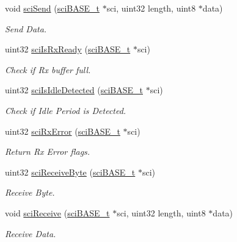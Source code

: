 \begin{DoxyCompactItemize}
void \mbox{\hyperlink{group__SCI_ga0a24e75961adf4102892d78e9620c042}{sci\+Send}} (\mbox{\hyperlink{reg__sci_8h_ad5e2af74efb062728408d4ac1b7735db}{sci\+B\+A\+S\+E\+\_\+t}} $\ast$sci, uint32 length, uint8 $\ast$data)
\begin{DoxyCompactList}\small\item\em Send Data. \end{DoxyCompactList}\item 
uint32 \mbox{\hyperlink{group__SCI_ga030ca3a9ad5bf48a7215be9d4078ad49}{sci\+Is\+Rx\+Ready}} (\mbox{\hyperlink{reg__sci_8h_ad5e2af74efb062728408d4ac1b7735db}{sci\+B\+A\+S\+E\+\_\+t}} $\ast$sci)
\begin{DoxyCompactList}\small\item\em Check if Rx buffer full. \end{DoxyCompactList}\item 
uint32 \mbox{\hyperlink{group__SCI_gabb100a9163984ca6c9a69133b8eba657}{sci\+Is\+Idle\+Detected}} (\mbox{\hyperlink{reg__sci_8h_ad5e2af74efb062728408d4ac1b7735db}{sci\+B\+A\+S\+E\+\_\+t}} $\ast$sci)
\begin{DoxyCompactList}\small\item\em Check if Idle Period is Detected. \end{DoxyCompactList}\item 
uint32 \mbox{\hyperlink{group__SCI_ga36cb42a55bca0fe4e76f3b994fb6dfc4}{sci\+Rx\+Error}} (\mbox{\hyperlink{reg__sci_8h_ad5e2af74efb062728408d4ac1b7735db}{sci\+B\+A\+S\+E\+\_\+t}} $\ast$sci)
\begin{DoxyCompactList}\small\item\em Return Rx Error flags. \end{DoxyCompactList}\item 
uint32 \mbox{\hyperlink{group__SCI_gaec2932431dfdcdef7c3aba3da9cf4fe7}{sci\+Receive\+Byte}} (\mbox{\hyperlink{reg__sci_8h_ad5e2af74efb062728408d4ac1b7735db}{sci\+B\+A\+S\+E\+\_\+t}} $\ast$sci)
\begin{DoxyCompactList}\small\item\em Receive Byte. \end{DoxyCompactList}\item 
void \mbox{\hyperlink{group__SCI_ga2452fb07e6ad52632e100fed774f9087}{sci\+Receive}} (\mbox{\hyperlink{reg__sci_8h_ad5e2af74efb062728408d4ac1b7735db}{sci\+B\+A\+S\+E\+\_\+t}} $\ast$sci, uint32 length, uint8 $\ast$data)
\begin{DoxyCompactList}\small\item\em Receive Data. \end{DoxyCompactList}\item 

\end{DoxyCompactItemize}
